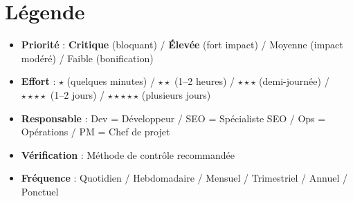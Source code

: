 \documentclass[12pt,a4paper,twoside]{report}
\newcommand{\important}[1]{\textbf{\textcolor{googlered}{#1}}}
\begin{document}
\section*{Légende}
\begin{itemize}
    \item \textbf{Priorité} : \important{Critique} (bloquant) / \textbf{Élevée} (fort impact) / Moyenne (impact modéré) / Faible (bonification)
    \item \textbf{Effort} : $\star$ (quelques minutes) / $\star\star$ (1--2 heures) / $\star\star\star$ (demi-journée) / $\star\star\star\star$ (1--2 jours) / $\star\star\star\star\star$ (plusieurs jours)
    \item \textbf{Responsable} : Dev = Développeur / SEO = Spécialiste SEO / Ops = Opérations / PM = Chef de projet
    \item \textbf{Vérification} : Méthode de contrôle recommandée
    \item \textbf{Fréquence} : Quotidien / Hebdomadaire / Mensuel / Trimestriel / Annuel / Ponctuel
\end{itemize}
\end{document}
